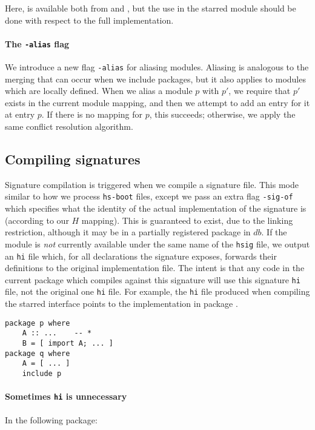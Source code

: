 \documentclass{article}
\begin{document}
Here,  is available both from  and , but the use in the
starred module should be done with respect to the full implementation.

\paragraph{The \texttt{-alias} flag}  We introduce a new flag
\texttt{-alias} for aliasing modules.  Aliasing is analogous to
the merging that can occur when we include packages, but it also applies
to modules which are locally defined.  When we alias a module $p$ with
$p'$, we require that $p'$ exists in the current module mapping, and then
we attempt to add an entry for it at entry $p$.  If there is no mapping for
$p$, this succeeds; otherwise, we apply the same conflict resolution algorithm.

\subsection{Compiling signatures}

Signature compilation is triggered when we compile a signature file.
This mode similar to how we process \verb|hs-boot| files, except
we pass an extra flag \verb|-sig-of| which specifies what the
identity of the actual implementation of the signature is (according to our $H$
mapping).  This is guaranteed to exist, due to the linking
restriction, although it may be in a partially registered package
in $db$.  If the module is \emph{not} currently available under the same name of the
\texttt{hsig} file, we output an \texttt{hi} file which, for all declarations the
signature exposes, forwards their definitions to the original
implementation file.  The intent is that any code in the current package
which compiles against this signature will use this signature \texttt{hi} file,
not the original one \texttt{hi} file.
For example, the \texttt{hi} file produced when compiling the starred interface
points to the implementation in package .

\begin{verbatim}
package p where
    A :: ...    -- *
    B = [ import A; ... ]
package q where
    A = [ ... ]
    include p
\end{verbatim}

\paragraph{Sometimes \texttt{hi} is unnecessary}
In the following package:
\end{document}
